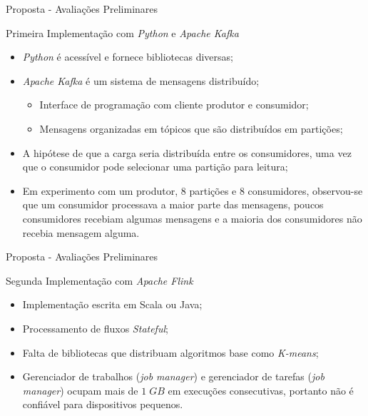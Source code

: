 \documentclass[aspectratio=1610,10pt]{beamer}
\begin{document}
\begin{frame}[fragile]{Proposta - Avaliações Preliminares}
  \begin{alertblock}{Primeira Implementação com \emph{Python} e \emph{Apache Kafka}}
    \begin{itemize}%
      \item \emph{Python} é acessível e fornece bibliotecas diversas;
      \item \emph{Apache Kafka} é um sistema de mensagens distribuído;
      \begin{itemize}
        \item Interface de programação com cliente produtor e consumidor;
        \item Mensagens organizadas em tópicos que são distribuídos em partições;
      \end{itemize}
      \item A hipótese de que a carga seria distribuída entre os consumidores,
      uma vez que o consumidor pode selecionar uma partição para leitura;
      \item Em experimento com um produtor, 8 partições e 8 consumidores,
      observou-se que um consumidor processava a maior parte das mensagens,
      poucos consumidores recebiam algumas mensagens e a maioria dos consumidores
      não recebia mensagem alguma.
    \end{itemize}
  \end{alertblock}
\end{frame}

\begin{frame}[fragile]{Proposta - Avaliações Preliminares}
  \begin{alertblock}{Segunda Implementação com \emph{Apache Flink}}
    \begin{itemize}%
      \item Implementação escrita em Scala ou Java;
      \item Processamento de fluxos \emph{Stateful};
      \item Falta de bibliotecas que distribuam algoritmos base como \emph{K-means};
      \item Gerenciador de trabalhos (\emph{job manager}) e gerenciador de
      tarefas (\emph{job manager}) ocupam mais de $1\;GB$ em execuções
      consecutivas, portanto não é confiável para dispositivos pequenos.
    \end{itemize}
  \end{alertblock}
\end{frame}
\end{document}
